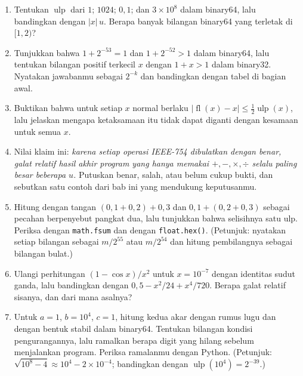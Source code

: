 \begin{latihan}
\begin{enumerate}
  \item Tentukan $\operatorname{ulp}$ dari $1$; $1024$; $0{,}1$; dan $3\times10^{8}$
        dalam binary64, lalu bandingkan dengan $|x|\,u$. Berapa banyak bilangan
        binary64 yang terletak di $[1,2)$?

  \item Tunjukkan bahwa $1+2^{-53}=1$ dan $1+2^{-52}>1$ dalam binary64, lalu tentukan
        bilangan positif terkecil $x$ dengan $1+x>1$ dalam binary32. Nyatakan
        jawabanmu sebagai $2^{-k}$ dan bandingkan dengan tabel di bagian awal.

  \item Buktikan bahwa untuk setiap $x$ normal berlaku
        $|\operatorname{fl}(x)-x|\le\tfrac12\operatorname{ulp}(x)$, lalu jelaskan
        mengapa ketaksamaan itu tidak dapat diganti dengan kesamaan untuk semua $x$.

  \item Nilai klaim ini: \emph{karena setiap operasi IEEE-754 dibulatkan dengan benar,
        galat relatif hasil akhir program yang hanya memakai $+,-,\times,\div$ selalu
        paling besar beberapa $u$.} Putuskan benar, salah, atau belum cukup bukti, dan
        sebutkan satu contoh dari bab ini yang mendukung keputusanmu.

  \item Hitung dengan tangan $(0{,}1+0{,}2)+0{,}3$ dan $0{,}1+(0{,}2+0{,}3)$ sebagai
        pecahan berpenyebut pangkat dua, lalu tunjukkan bahwa selisihnya satu ulp.
        Periksa dengan \texttt{math.fsum} dan dengan \texttt{float.hex()}.
        (Petunjuk: nyatakan setiap bilangan sebagai $m/2^{55}$ atau $m/2^{54}$ dan
        hitung pembilangnya sebagai bilangan bulat.)

  \item Ulangi perhitungan $(1-\cos x)/x^{2}$ untuk $x=10^{-7}$ dengan identitas sudut
        ganda, lalu bandingkan dengan $0{,}5-x^{2}/24+x^{4}/720$. Berapa galat relatif
        sisanya, dan dari mana asalnya?

  \item Untuk $a=1$, $b=10^{4}$, $c=1$, hitung kedua akar dengan rumus lugu dan dengan
        bentuk stabil dalam binary64. Tentukan bilangan kondisi pengurangannya, lalu
        ramalkan berapa digit yang hilang sebelum menjalankan program. Periksa
        ramalanmu dengan Python.
        (Petunjuk: $\sqrt{10^{8}-4}\approx10^{4}-2\times10^{-4}$; bandingkan dengan
        $\operatorname{ulp}(10^{4})=2^{-39}$.)


\end{enumerate}
\end{latihan}
